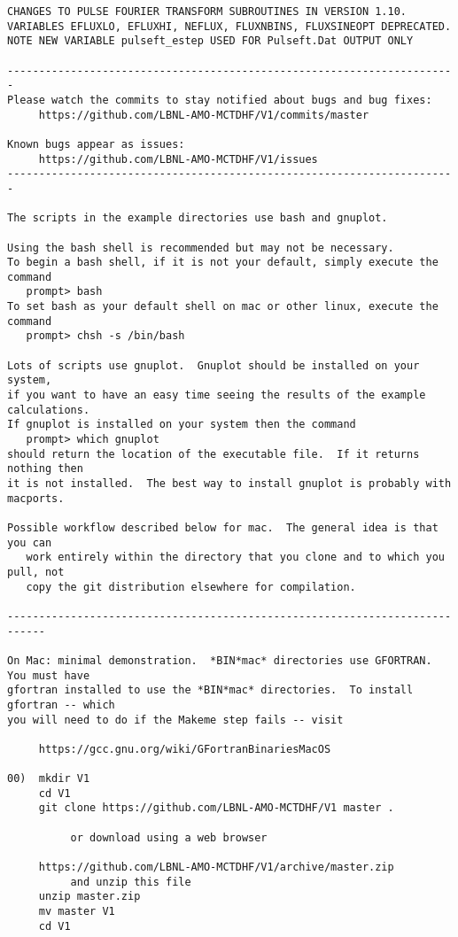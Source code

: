 \begin{verbatim}
CHANGES TO PULSE FOURIER TRANSFORM SUBROUTINES IN VERSION 1.10.
VARIABLES EFLUXLO, EFLUXHI, NEFLUX, FLUXNBINS, FLUXSINEOPT DEPRECATED.
NOTE NEW VARIABLE pulseft_estep USED FOR Pulseft.Dat OUTPUT ONLY

-----------------------------------------------------------------------
Please watch the commits to stay notified about bugs and bug fixes:
     https://github.com/LBNL-AMO-MCTDHF/V1/commits/master

Known bugs appear as issues:
     https://github.com/LBNL-AMO-MCTDHF/V1/issues
-----------------------------------------------------------------------

The scripts in the example directories use bash and gnuplot.  

Using the bash shell is recommended but may not be necessary.
To begin a bash shell, if it is not your default, simply execute the command
   prompt> bash
To set bash as your default shell on mac or other linux, execute the command
   prompt> chsh -s /bin/bash

Lots of scripts use gnuplot.  Gnuplot should be installed on your system,
if you want to have an easy time seeing the results of the example calculations.
If gnuplot is installed on your system then the command
   prompt> which gnuplot
should return the location of the executable file.  If it returns nothing then
it is not installed.  The best way to install gnuplot is probably with macports.

Possible workflow described below for mac.  The general idea is that you can 
   work entirely within the directory that you clone and to which you pull, not 
   copy the git distribution elsewhere for compilation.

----------------------------------------------------------------------------

On Mac: minimal demonstration.  *BIN*mac* directories use GFORTRAN.  You must have
gfortran installed to use the *BIN*mac* directories.  To install gfortran -- which
you will need to do if the Makeme step fails -- visit 

     https://gcc.gnu.org/wiki/GFortranBinariesMacOS

00)  mkdir V1
     cd V1
     git clone https://github.com/LBNL-AMO-MCTDHF/V1 master .

          or download using a web browser

     https://github.com/LBNL-AMO-MCTDHF/V1/archive/master.zip
          and unzip this file
     unzip master.zip
     mv master V1
     cd V1


\end{verbatim}
